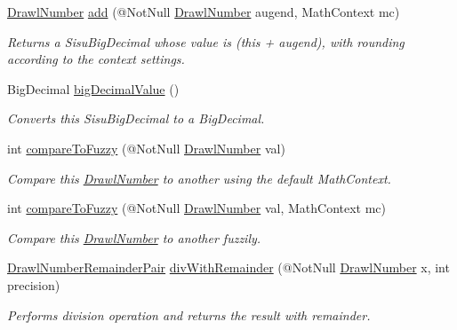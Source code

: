 \begin{DoxyCompactItemize}
\hyperlink{classcom_1_1aarrelaakso_1_1drawl_1_1_drawl_number}{Drawl\+Number} \hyperlink{classcom_1_1aarrelaakso_1_1drawl_1_1_drawl_number_a662ec93df5afeaa42ce9aee206625338}{add} (@Not\+Null \hyperlink{classcom_1_1aarrelaakso_1_1drawl_1_1_drawl_number}{Drawl\+Number} augend, Math\+Context mc)
\begin{DoxyCompactList}\small\item\em Returns a Sisu\+Big\+Decimal whose value is (this + augend), with rounding according to the context settings. \end{DoxyCompactList}\item 
Big\+Decimal \hyperlink{classcom_1_1aarrelaakso_1_1drawl_1_1_drawl_number_acf97abc572acd173a4d8cd6c5b5c2ecd}{big\+Decimal\+Value} ()
\begin{DoxyCompactList}\small\item\em Converts this Sisu\+Big\+Decimal to a Big\+Decimal. \end{DoxyCompactList}\item 
int \hyperlink{classcom_1_1aarrelaakso_1_1drawl_1_1_drawl_number_a3d2e5dfb0be1738bf114eefd27692a4a}{compare\+To\+Fuzzy} (@Not\+Null \hyperlink{classcom_1_1aarrelaakso_1_1drawl_1_1_drawl_number}{Drawl\+Number} val)
\begin{DoxyCompactList}\small\item\em Compare this \hyperlink{classcom_1_1aarrelaakso_1_1drawl_1_1_drawl_number}{Drawl\+Number} to another using the default Math\+Context. \end{DoxyCompactList}\item 
int \hyperlink{classcom_1_1aarrelaakso_1_1drawl_1_1_drawl_number_a1b67bd833c724edd8ef7c6bdf387b96f}{compare\+To\+Fuzzy} (@Not\+Null \hyperlink{classcom_1_1aarrelaakso_1_1drawl_1_1_drawl_number}{Drawl\+Number} val, Math\+Context mc)
\begin{DoxyCompactList}\small\item\em Compare this \hyperlink{classcom_1_1aarrelaakso_1_1drawl_1_1_drawl_number}{Drawl\+Number} to another fuzzily. \end{DoxyCompactList}\item 
\hyperlink{classcom_1_1aarrelaakso_1_1drawl_1_1_drawl_number_remainder_pair}{Drawl\+Number\+Remainder\+Pair} \hyperlink{classcom_1_1aarrelaakso_1_1drawl_1_1_drawl_number_a2e6d107711bd1622499bb4f2e8f7c2d3}{div\+With\+Remainder} (@Not\+Null \hyperlink{classcom_1_1aarrelaakso_1_1drawl_1_1_drawl_number}{Drawl\+Number} x, int precision)
\begin{DoxyCompactList}\small\item\em Performs division operation and returns the result with remainder. \end{DoxyCompactList}\item 

\end{DoxyCompactItemize}
